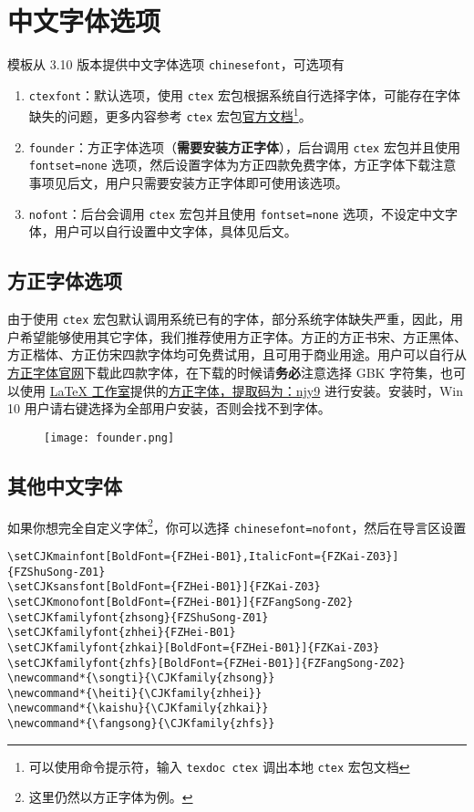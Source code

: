 \documentclass[lang=cn,10pt]{elegantbook}
\begin{document}
\section{中文字体选项}
模板从 3.10 版本提供中文字体选项 \lstinline{chinesefont}，可选项有
\begin{enumerate}
\item \lstinline{ctexfont}：默认选项，使用 \lstinline{ctex} 宏包根据系统自行选择字体，可能存在字体缺失的问题，更多内容参考 \lstinline{ctex} 宏包\href{https://ctan.org/pkg/ctex}{官方文档}\footnote{可以使用命令提示符，输入 \lstinline{texdoc ctex} 调出本地 \lstinline{ctex} 宏包文档}。
\item \lstinline{founder}：方正字体选项（\textbf{需要安装方正字体}），后台调用 \lstinline{ctex} 宏包并且使用 \lstinline{fontset=none} 选项，然后设置字体为方正四款免费字体，方正字体下载注意事项见后文，用户只需要安装方正字体即可使用该选项。
\item \lstinline{nofont}：后台会调用 \lstinline{ctex} 宏包并且使用 \lstinline{fontset=none} 选项，不设定中文字体，用户可以自行设置中文字体，具体见后文。
\end{enumerate}

\subsection{方正字体选项}
由于使用 \lstinline{ctex} 宏包默认调用系统已有的字体，部分系统字体缺失严重，因此，用户希望能够使用其它字体，我们推荐使用方正字体。方正的{\songti 方正书宋}、{\heiti 方正黑体}、{\kaishu 方正楷体}、{\fangsong 方正仿宋}四款字体均可免费试用，且可用于商业用途。用户可以自行从\href{http://www.foundertype.com/}{方正字体官网}下载此四款字体，在下载的时候请\textbf{务必}注意选择 GBK 字符集，也可以使用 \href{https://www.latexstudio.net/}{\LaTeX{} 工作室}提供的\href{https://pan.baidu.com/s/1BgbQM7LoinY7m8yeP25Y7Q}{方正字体，提取码为：njy9} 进行安装。安装时，{\kaishu Win 10 用户请右键选择为全部用户安装，否则会找不到字体。}

\begin{figure}[!htb]
\centering
\texttt{[image: founder.png]}
\end{figure}

\subsection{其他中文字体}
如果你想完全自定义字体\footnote{这里仍然以方正字体为例。}，你可以选择 \lstinline{chinesefont=nofont}，然后在导言区设置
\begin{lstlisting}
\setCJKmainfont[BoldFont={FZHei-B01},ItalicFont={FZKai-Z03}]{FZShuSong-Z01}
\setCJKsansfont[BoldFont={FZHei-B01}]{FZKai-Z03}
\setCJKmonofont[BoldFont={FZHei-B01}]{FZFangSong-Z02}
\setCJKfamilyfont{zhsong}{FZShuSong-Z01}
\setCJKfamilyfont{zhhei}{FZHei-B01}
\setCJKfamilyfont{zhkai}[BoldFont={FZHei-B01}]{FZKai-Z03}
\setCJKfamilyfont{zhfs}[BoldFont={FZHei-B01}]{FZFangSong-Z02}
\newcommand*{\songti}{\CJKfamily{zhsong}}
\newcommand*{\heiti}{\CJKfamily{zhhei}}
\newcommand*{\kaishu}{\CJKfamily{zhkai}}
\newcommand*{\fangsong}{\CJKfamily{zhfs}}
\end{lstlisting}
\end{document}

